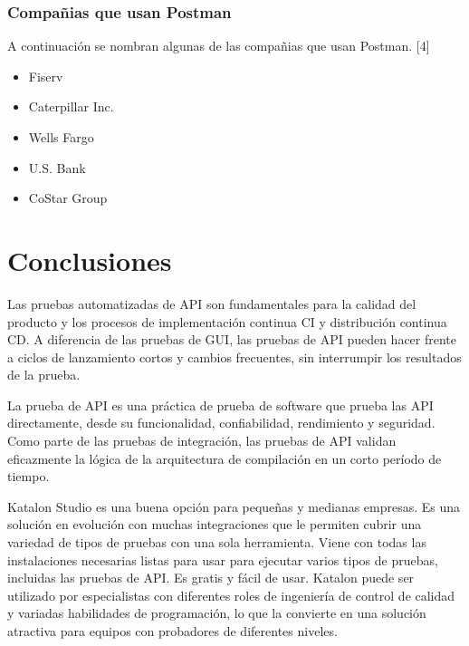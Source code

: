 \documentclass[twoside,twocolumn]{article}
\begin{document}
\subsubsection{Compañias que usan Postman}

A continuación se nombran algunas de las compañias que usan Postman. [4]

\begin{itemize}
  \item Fiserv
  \item Caterpillar Inc.
  \item Wells Fargo
  \item U.S. Bank
  \item CoStar Group
\end{itemize}





\section{Conclusiones}

Las pruebas automatizadas de API son fundamentales para la calidad del producto y los procesos de implementación continua CI y distribución continua CD. A diferencia de las pruebas de GUI, las pruebas de API pueden hacer frente a ciclos de lanzamiento cortos y cambios frecuentes, sin interrumpir los resultados de la prueba.

La prueba de API es una práctica de prueba de software que prueba las API directamente, desde su funcionalidad, confiabilidad, rendimiento y seguridad. Como parte de las pruebas de integración, las pruebas de API validan eficazmente la lógica de la arquitectura de compilación en un corto período de tiempo. 

Katalon Studio es una buena opción para pequeñas y medianas empresas. Es una solución en evolución con muchas integraciones que le permiten cubrir una variedad de tipos de pruebas con una sola herramienta. Viene con todas las instalaciones necesarias listas para usar para ejecutar varios tipos de pruebas, incluidas las pruebas de API. Es gratis y fácil de usar. Katalon puede ser utilizado por especialistas con diferentes roles de ingeniería de control de calidad y variadas habilidades de programación, lo que la convierte en una solución atractiva para equipos con probadores de diferentes niveles.
\end{document}
